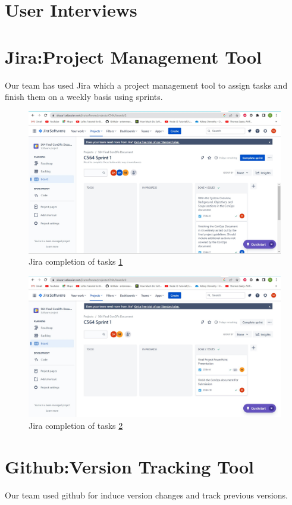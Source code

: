     
\section{ User Interviews \label{Section::User Interviews} }






\section{ Jira:Project Management Tool \label{Jira Project Management Tool} }
Our team has used Jira which a project management tool to assign tasks and finish them on a weekly basis using sprints. 

\begin{figure}[H]
    \centering
    \includegraphics[scale=0.43]{Figures/Jira all completed tasks.jpg}
    \caption{Jira completion of tasks \ref{fig::Jira all completed tasks}}
    \label{fig::Jira all completed tasks}
\end{figure}


\begin{figure}[H]
    \centering
    \includegraphics[scale=0.43]{Figures/All tasks completed.jpg}
    \caption{Jira completion of tasks \ref{fig::All tasks completed.jpg}}
    \label{fig::All tasks completed.jpg}
\end{figure}



\section{ Github:Version Tracking Tool \label{Github Version Tracking Tool} }

Our team used github for induce version changes and track previous versions. 

